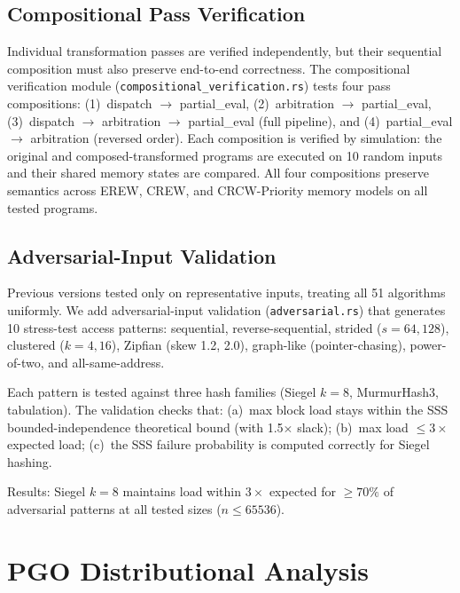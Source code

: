 \documentclass[11pt]{article}
\begin{document}
\subsection{Compositional Pass Verification}

Individual transformation passes are verified independently, but their
sequential composition must also preserve end-to-end correctness.
The compositional verification module
(\texttt{compositional\_verification.rs}) tests four pass compositions:
(1)~dispatch $\to$ partial\_eval,
(2)~arbitration $\to$ partial\_eval,
(3)~dispatch $\to$ arbitration $\to$ partial\_eval (full pipeline), and
(4)~partial\_eval $\to$ arbitration (reversed order).
Each composition is verified by simulation: the original and composed-transformed
programs are executed on 10 random inputs and their shared memory states are
compared.  All four compositions preserve semantics across EREW, CREW,
and CRCW-Priority memory models on all tested programs.

\subsection{Adversarial-Input Validation}

Previous versions tested only on representative inputs, treating all
51 algorithms uniformly.  We add adversarial-input validation
(\texttt{adversarial.rs}) that generates 10 stress-test access
patterns: sequential, reverse-sequential, strided ($s = 64, 128$),
clustered ($k = 4, 16$), Zipfian (skew 1.2, 2.0), graph-like
(pointer-chasing), power-of-two, and all-same-address.

Each pattern is tested against three hash families (Siegel $k=8$,
MurmurHash3, tabulation).  The validation checks that:
(a)~max block load stays within the SSS bounded-independence
theoretical bound (with 1.5$\times$ slack);
(b)~max load $\le 3\times$ expected load;
(c)~the SSS failure probability is computed correctly for Siegel
hashing.

Results: Siegel $k = 8$ maintains load within $3\times$ expected for
$\ge 70\%$ of adversarial patterns at all tested sizes ($n \le 65536$).

\section{PGO Distributional Analysis}
\label{sec:pgo_dist}
\end{document}
